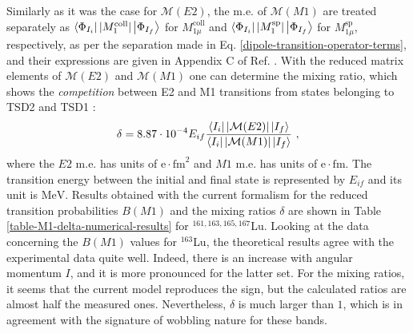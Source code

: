 Similarly as it was the case for $\mathcal{M}(E2)$, the m.e. of $\mathcal{M}(M1)$ are treated separately as $\bra{\Phi_{I_i}}|M_1^\text{coll}|\ket{\Phi_{I_f}}$ for $M_{1\mu}^\text{coll}$ and $\bra{\Phi_{I_i}}|M_1^\text{sp}|\ket{\Phi_{I_f}}$ for $M_{1\mu}^\text{sp}$, respectively, as per the separation made in Eq. \ref{dipole-transition-operator-terms}, and their expressions are given in Appendix C of Ref. \cite{raduta2017semiclassical}. With the reduced matrix elements of $\mathcal{M}(E2)$ and $\mathcal{M}(M1)$ one can determine the mixing ratio, which shows the \emph{competition} between E2 and M1 transitions from states belonging to TSD2 and TSD1 \cite{krane1970determination,toki1975asymmetric}:
\begin{align}
    \delta=8.87\cdot 10^{-4}E_{if}\frac{\bra{I_i}|\mathcal{M}(E2)|\ket{I_f}}{\bra{I_i}|\mathcal{M}(M1)|\ket{I_f}}\ ,
    \label{mixing-ratio-Lu-isotopes}
\end{align}
where the $E2$ m.e. has units of $\mathrm{e}\cdot\text{fm}^2$ and $M1$ m.e. has units of $\mathrm{e}\cdot\text{fm}$. The transition energy between the initial and final state is represented by $E_{if}$ and its unit is $\text{MeV}$. Results obtained with the current formalism for the reduced transition probabilities $B(M1)$ and the mixing ratios $\delta$ are shown in Table \ref{table-M1-delta-numerical-results} for $^{161,163,165,167}$Lu. Looking at the data concerning the $B(M1)$ values for $^{163}$Lu, the theoretical results agree with the experimental data quite well. Indeed, there is an increase with angular momentum $I$, and it is more pronounced for the latter set. For the mixing ratios, it seems that the current model reproduces the sign, but the calculated ratios are almost half the measured ones. Nevertheless, $\delta$ is much larger than $1$, which is in agreement with the signature of wobbling nature for these bands.
